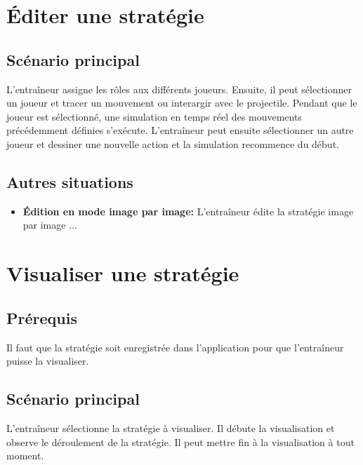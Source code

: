 \section{\'Editer une stratégie}
\label{sec:ajouter_une_strategie}

\subsection{Sc\'enario principal}
\label{sub:sc'enario_principal}

L'entraîneur assigne les r\^oles aux diff\'erents joueurs.
Ensuite, il peut s\'electionner un joueur et tracer un mouvement ou interargir avec le projectile.
Pendant que le joueur est s\'electionn\'e, une simulation en temps r\'eel des mouvements pr\'ec\'edemment d\'efinies s'ex\'ecute.
L'entraîneur peut ensuite s\'electionner un autre joueur et dessiner une nouvelle action et la simulation recommence du d\'ebut.

\subsection{Autres situations}
\label{sub:autres_situations}

\begin{itemize}
    \item \textbf{Édition en mode image par image:} L'entraîneur édite la strat\'egie image par image ...
\end{itemize}



\section{Visualiser une stratégie}
\label{sec:visualiser_une_strategie}

\subsection{Pr\'erequis}
\label{sub:prerequis}
Il faut que la strat\'egie soit enregistr\'ee dans l'application pour que l'entraîneur puisse la visualiser.

\subsection{Sc\'enario principal}
\label{sub:sc'enario_principal}

L'entra\^ineur s\'electionne la strat\'egie \`a visualiser.
Il d\'ebute la visualisation et observe le d\'eroulement de la strat\'egie.
Il peut mettre fin \`a la visualisation \`a tout moment.



